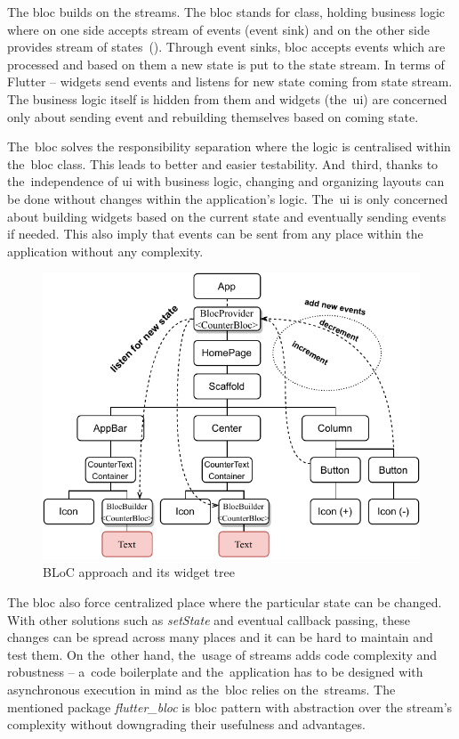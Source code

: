 The \gls{bloc} builds on the streams. The \gls{bloc} stands for class, holding business logic where on one side accepts stream of events (event sink) and on the other side provides stream of states~(). Through event sinks, \gls{bloc} accepts events which are processed and based on them a new state is put to the state stream. In terms of Flutter -- widgets send events and listens for new state coming from state stream. The business logic itself is hidden from them and widgets (the~\gls{ui}) are concerned only about sending event and rebuilding themselves based on coming state.

The~\gls{bloc} solves the responsibility separation where the logic is centralised within the~\gls{bloc} class. This leads to better and easier testability. And~third, thanks to the~independence of \gls{ui} with business logic, changing and organizing layouts can be done without changes within the application's logic. The~\gls{ui} is only concerned about building widgets based on the current state and eventually sending events if needed. This also imply that events can be sent from any place within the application without any complexity.

\begin{figure}[ht]
    \centering
    \includegraphics[width=0.75\linewidth]{img/flutter/counter-bloc.pdf}
    \caption{BLoC approach and its widget tree}
    \label{fig:counter-app-bloc}
\end{figure}

The \gls{bloc} also force centralized place where the particular state can be changed. With other solutions such as \textit{setState} and eventual callback passing, these changes can be spread across many places and it can be hard to maintain and test them. On the~other hand, the~usage of streams adds code complexity and robustness -- a~code boilerplate and the~application has to be designed with asynchronous execution in mind as the~\gls{bloc} relies on the~streams. The mentioned package \textit{flutter\_bloc} is \gls{bloc} pattern with abstraction over the stream's complexity without downgrading their usefulness and advantages. 

